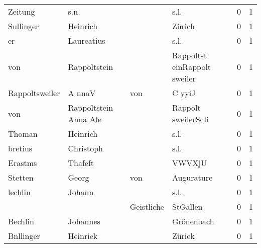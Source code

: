 \documentclass[10pt,a4paper,landscape]{article}
\begin{document}
\begin{longtable}{llllrr}
                  Zeitung &                               s.n. &             &                                        s.l. &          0 &         1 \\
                Sullinger &                           Heinrich &             &                                      Zürich &          0 &         1 \\
                       er &                         Laureatius &             &                                        s.l. &          0 &         1 \\
                      von &                       Rappoltstein &             &                Rappoltst einRappolt sweiler &          0 &         1 \\
           Rappoltsweiler &                             A nnaV &         von &                                      C yyiJ &          0 &         1 \\
                      von &              Rappoltstein Anna Ale &             &                         Rappolt sweilerScIi &          0 &         1 \\
                   Thoman &                           Heinrich &             &                                        s.l. &          0 &         1 \\
                  bretius &                          Christoph &             &                                        s.l. &          0 &         1 \\
                  Erastms &                            Thafeft &             &                                      VWVXjU &          0 &         1 \\
                  Stetten &                              Georg &         von &                                  Augurature &          0 &         1 \\
                  lechlin &                             Johann &             &                                        s.l. &          0 &         1 \\
                          &                                    &  Geistliche &                                    StGallen &          0 &         1 \\
                  Bechlin &                           Johannes &             &                                  Grönenbach &          0 &         1 \\
                Bnllinger &                           Heinriek &             &                                      Züriek &          0 &         1 \\

\end{longtable}
\end{document}
